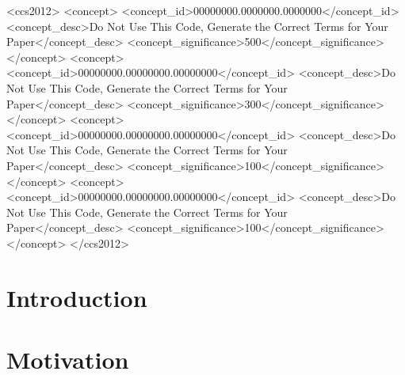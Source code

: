\documentclass[manuscript,screen,review]{acmart}
\begin{document}
\begin{CCSXML}
<ccs2012>
 <concept>
  <concept_id>00000000.0000000.0000000</concept_id>
  <concept_desc>Do Not Use This Code, Generate the Correct Terms for Your Paper</concept_desc>
  <concept_significance>500</concept_significance>
 </concept>
 <concept>
  <concept_id>00000000.00000000.00000000</concept_id>
  <concept_desc>Do Not Use This Code, Generate the Correct Terms for Your Paper</concept_desc>
  <concept_significance>300</concept_significance>
 </concept>
 <concept>
  <concept_id>00000000.00000000.00000000</concept_id>
  <concept_desc>Do Not Use This Code, Generate the Correct Terms for Your Paper</concept_desc>
  <concept_significance>100</concept_significance>
 </concept>
 <concept>
  <concept_id>00000000.00000000.00000000</concept_id>
  <concept_desc>Do Not Use This Code, Generate the Correct Terms for Your Paper</concept_desc>
  <concept_significance>100</concept_significance>
 </concept>
</ccs2012>
\end{CCSXML}




\maketitle

\section{Introduction}
\section{Motivation}
\end{document}
